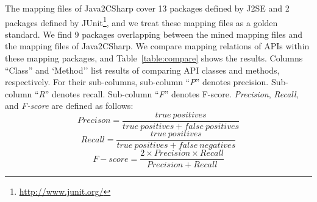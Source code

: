 The mapping files of Java2CSharp cover 13 packages defined by J2SE
and 2 packages defined by
JUnit\footnote{\url{http://www.junit.org/}}, and we treat these
mapping files as a golden standard. We find 9 packages overlapping
between the mined mapping files and the mapping files of
Java2CSharp. We compare mapping relations of APIs within these
mapping packages, and Table~\ref{table:compare} shows the results.
Columns ``Class'' and `Method'' list results of comparing API
classes and methods, respectively. For their sub-columns, sub-column
``\emph{P}'' denotes precision. Sub-column ``\emph{R}'' denotes
recall. Sub-column ``\emph{F}'' denotes F-score. \emph{Precision},
\emph{Recall}, and \emph{F-score} are defined as
follows:\vspace*{-1ex}
\begin{equation}\label{eq-precison}
Precison=\frac{true\ positives}{true\ positives+false\ positives}
\end{equation}\vspace*{-2ex}
\begin{equation}\label{eq-recall}
Recall=\frac{true\ positives}{true\ positives+false\ negatives}
\end{equation}\vspace*{-2ex}
\begin{equation}\label{eq-fscore}
F\!-\!score=\frac{2\times Precision \times Recall}{Precision+Recall}
\end{equation}\vspace*{-2ex}

